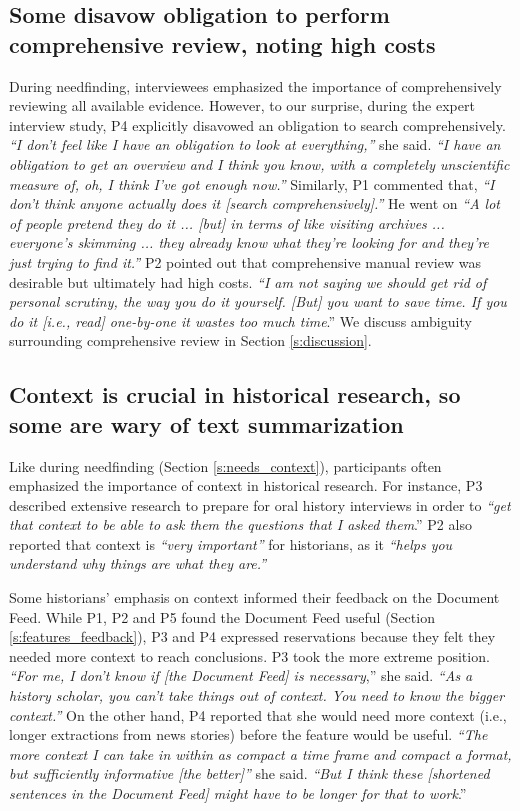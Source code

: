\subsection{Some disavow obligation to perform comprehensive review, noting high costs}\label{s:expert_interview_comprehensivenesss}

During needfinding, interviewees emphasized the importance of comprehensively reviewing all available evidence. 
However, to our surprise,  during the expert interview study, P4 explicitly disavowed an obligation to search comprehensively. \textit{``I don't feel like I have an obligation to look at everything,''} she said. \textit{``I have an obligation to get an overview and I think you know, with a completely unscientific measure of, oh, I think I've got enough now.''} 
Similarly, P1 commented that, 
\textit{``I don't think anyone actually does it [search comprehensively].''}
He went on \textit{``A lot of people pretend they do it ... [but] in terms of like visiting archives ... everyone's skimming ... they already know what they're looking for and they're just trying to find it.''}
P2 pointed out that comprehensive manual review was desirable but ultimately had high costs. \textit{``I am not saying we should get rid of personal scrutiny, the way you do it yourself. [But] you want to save time. If you do it [i.e., read] one-by-one it wastes too much time}.'' We discuss ambiguity surrounding comprehensive review in Section \ref{s:discussion}.

\subsection{Context is crucial in historical research, so some are wary of text summarization}\label{s:feedback_context}

Like during needfinding (Section \ref{s:needs_context}), participants often emphasized the importance of context in historical research. For instance, P3 described extensive research to prepare for oral history interviews in order to \textit{``get that context to be able to ask them the questions that I asked them}.''  P2 also reported that context is \textit{``very important''} for historians, as it \textit{``helps you understand why things are what they are.''} 

Some historians' emphasis on context informed their feedback on the Document Feed. While P1, P2 and P5 found the Document Feed useful (Section \ref{s:features_feedback}), P3 and P4 expressed reservations because they felt they needed more context to reach conclusions. P3 took the more extreme position.
\textit{``For me, I don't know if [the Document Feed] is necessary},'' she said. \textit{``As a history scholar, you can't take things out of context. You need to know the bigger context.''} 
On the other hand, P4 reported that she would need more context (i.e., longer extractions from news stories) before the feature would be useful. 
\textit{``The more context I can take in within as compact a time frame and compact a format, but sufficiently informative [the better]''} she said. \textit{``But I think these [shortened sentences in the Document Feed] might have to be longer for that to work}.''  

